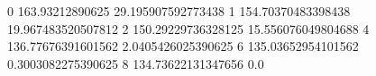 0 163.93212890625 29.195907592773438
1 154.70370483398438 19.967483520507812
2 150.29229736328125 15.556076049804688
4 136.77676391601562 2.0405426025390625
6 135.03652954101562 0.3003082275390625
8 134.73622131347656 0.0
